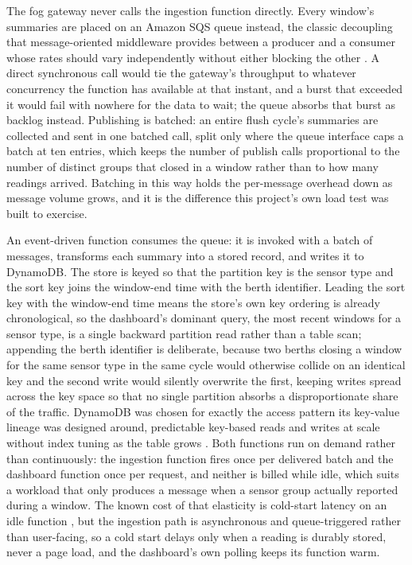 \documentclass[conference]{IEEEtran}
\begin{document}
The fog gateway never calls the ingestion function directly. Every window's summaries are placed on an Amazon SQS queue instead, the classic decoupling that message-oriented middleware provides between a producer and a consumer whose rates should vary independently without either blocking the other \cite{ref6}. A direct synchronous call would tie the gateway's throughput to whatever concurrency the function has available at that instant, and a burst that exceeded it would fail with nowhere for the data to wait; the queue absorbs that burst as backlog instead. Publishing is batched: an entire flush cycle's summaries are collected and sent in one batched call, split only where the queue interface caps a batch at ten entries, which keeps the number of publish calls proportional to the number of distinct groups that closed in a window rather than to how many readings arrived. Batching in this way holds the per-message overhead down as message volume grows, and it is the difference this project's own load test was built to exercise.

An event-driven function consumes the queue: it is invoked with a batch of messages, transforms each summary into a stored record, and writes it to DynamoDB. The store is keyed so that the partition key is the sensor type and the sort key joins the window-end time with the berth identifier. Leading the sort key with the window-end time means the store's own key ordering is already chronological, so the dashboard's dominant query, the most recent windows for a sensor type, is a single backward partition read rather than a table scan; appending the berth identifier is deliberate, because two berths closing a window for the same sensor type in the same cycle would otherwise collide on an identical key and the second write would silently overwrite the first, keeping writes spread across the key space so that no single partition absorbs a disproportionate share of the traffic. DynamoDB was chosen for exactly the access pattern its key-value lineage was designed around, predictable key-based reads and writes at scale without index tuning as the table grows \cite{ref7}. Both functions run on demand rather than continuously: the ingestion function fires once per delivered batch and the dashboard function once per request, and neither is billed while idle, which suits a workload that only produces a message when a sensor group actually reported during a window. The known cost of that elasticity is cold-start latency on an idle function \cite{ref8, ref13}, but the ingestion path is asynchronous and queue-triggered rather than user-facing, so a cold start delays only when a reading is durably stored, never a page load, and the dashboard's own polling keeps its function warm.
\end{document}
